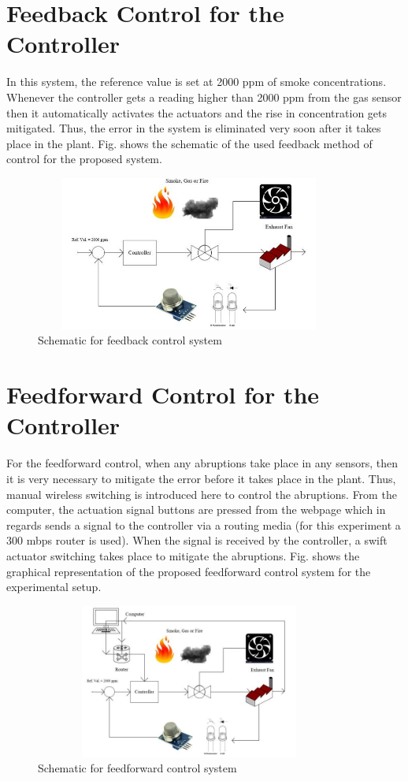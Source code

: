 \setlength{\parskip}{8.04pt}
\section{Feedback Control for the Controller }
In this system, the reference value is set at 2000 ppm of smoke concentrations. Whenever the controller gets a reading higher than 2000 ppm from the gas sensor then it automatically activates the actuators and the rise in concentration gets mitigated. Thus, the error in the system is eliminated very soon after it takes place in the plant. Fig. shows the schematic of the used feedback method of control for the proposed system.
\begin{figure}[H]
	\begin{Center}
		\includegraphics[width=4in,height=2in]{33}
		\caption{Schematic for feedback control system}
		\label{fig:_19_Schematic_for_feedback_control_system}
	\end{Center}
\end{figure}
\section{Feedforward Control for the Controller }
For the feedforward control, when any abruptions take place in any sensors, then it is very necessary to mitigate the error before it takes place in the plant. Thus, manual wireless switching is introduced here to control the abruptions. From the computer, the actuation signal buttons are pressed from the webpage which in regards sends a signal to the controller via\textit{ }a routing media (for this experiment a 300 mbps router is used). When the signal is received by the controller, a swift actuator switching takes place to mitigate the abruptions. Fig. shows the graphical representation of the proposed feedforward control system for the experimental setup.
\begin{figure}[H]
	\begin{Center}
		\includegraphics[width=4in,height=2in]{34}
		\caption{Schematic for feedforward control system}
		\label{fig:_20_Schematic_for_feedforward_control_system}
	\end{Center}
\end{figure}
